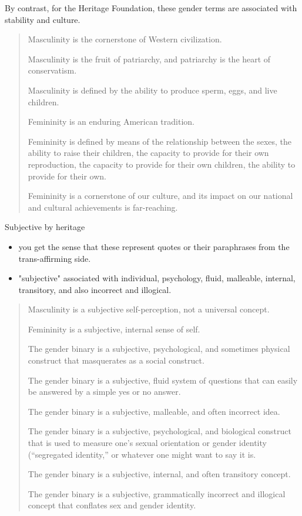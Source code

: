 \documentclass[11pt]{article}
\begin{document}
By contrast, for the Heritage Foundation, these gender terms are
associated with stability and culture. 

\begin{quote}
Masculinity is the cornerstone of Western civilization.

Masculinity is the fruit of patriarchy, and patriarchy is the heart
of conservatism.

Masculinity is defined by the ability to produce sperm, eggs, and live
children.

Femininity is an enduring American tradition.

Femininity is defined by means of the relationship between the sexes,
the ability to raise their children, the capacity to provide for their
own reproduction, the capacity to provide for their own children, the
ability to provide for their own.

Femininity is a cornerstone of our culture, and its impact on our
national and cultural achievements is far-reaching.
\end{quote}

Subjective by heritage
\begin{itemize}
\item you get the sense that these represent quotes or their paraphrases
from the trans-affirming side.
\item "subjective" associated with individual, psychology, fluid,
malleable, internal, transitory, and also incorrect and illogical.
\end{itemize}

\begin{quote}
Masculinity is a subjective self-perception, not a universal
concept.

Femininity is a subjective, internal sense of self.

The gender binary is a subjective, psychological, and sometimes
physical construct that masquerates as a social construct.

The gender binary is a subjective, fluid system of questions that can
easily be answered by a simple yes or no answer.

The gender binary is a subjective, malleable, and often incorrect
idea.

The gender binary is a subjective, psychological, and biological
construct that is used to measure one’s sexual orientation or gender
identity (“segregated identity,” or whatever one might want to say it
is.

The gender binary is a subjective, internal, and often transitory
concept.

The gender binary is a subjective, grammatically incorrect and
illogical concept that conflates sex and gender identity.
\end{quote}
\end{document}
